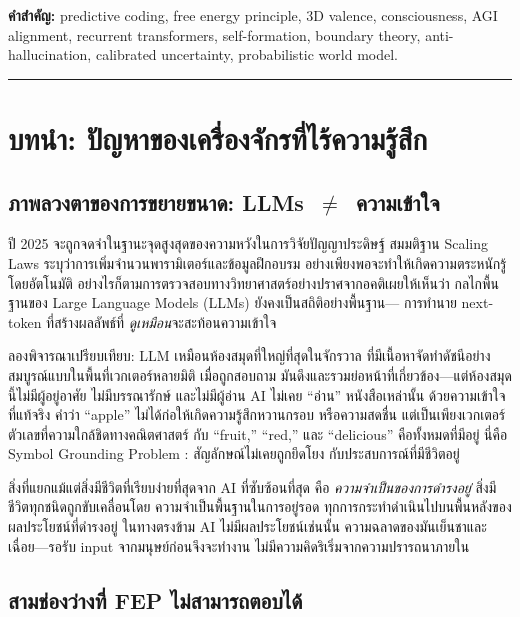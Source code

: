 \documentclass[12pt,a4paper]{article}
\begin{document}
\noindent\textbf{คำสำคัญ:}
predictive coding, free energy principle, 3D valence, consciousness,
AGI alignment, recurrent transformers, self-formation, boundary theory,
anti-hallucination, calibrated uncertainty, probabilistic world model.

\vspace{4pt}\hrule\vspace{6pt}
\tableofcontents
\newpage

\FloatBarrier
\section{บทนำ: ปัญหาของเครื่องจักรที่ไร้ความรู้สึก}

\subsection{ภาพลวงตาของการขยายขนาด: LLMs~$\neq$~ความเข้าใจ}

ปี 2025 จะถูกจดจำในฐานะจุดสูงสุดของความหวังในการวิจัยปัญญาประดิษฐ์
สมมติฐาน Scaling Laws ระบุว่าการเพิ่มจำนวนพารามิเตอร์และข้อมูลฝึกอบรม
อย่างเพียงพอจะทำให้เกิดความตระหนักรู้โดยอัตโนมัติ
อย่างไรก็ตามการตรวจสอบทางวิทยาศาสตร์อย่างปราศจากอคติเผยให้เห็นว่า
กลไกพื้นฐานของ Large Language Models (LLMs) ยังคงเป็นสถิติอย่างพื้นฐาน---
การทำนาย next-token ที่สร้างผลลัพธ์ที่ \emph{ดูเหมือน}จะสะท้อนความเข้าใจ

ลองพิจารณาเปรียบเทียบ: LLM เหมือนห้องสมุดที่ใหญ่ที่สุดในจักรวาล
ที่มีเนื้อหาจัดทำดัชนีอย่างสมบูรณ์แบบในพื้นที่เวกเตอร์หลายมิติ
เมื่อถูกสอบถาม มันดึงและรวมย่อหน้าที่เกี่ยวข้อง---แต่ห้องสมุดนี้ไม่มีผู้อยู่อาศัย
ไม่มีบรรณารักษ์ และไม่มีผู้อ่าน AI ไม่เคย ``อ่าน'' หนังสือเหล่านั้น
ด้วยความเข้าใจที่แท้จริง คำว่า ``apple'' ไม่ได้ก่อให้เกิดความรู้สึกหวานกรอบ
หรือความสดชื่น แต่เป็นเพียงเวกเตอร์ตัวเลขที่ความใกล้ชิดทางคณิตศาสตร์
กับ ``fruit,'' ``red,'' และ ``delicious'' คือทั้งหมดที่มีอยู่
นี่คือ Symbol Grounding Problem \citep{harnad1990}: สัญลักษณ์ไม่เคยถูกยึดโยง
กับประสบการณ์ที่มีชีวิตอยู่

สิ่งที่แยกแม้แต่สิ่งมีชีวิตที่เรียบง่ายที่สุดจาก AI ที่ซับซ้อนที่สุด
คือ \emph{ความจำเป็นของการดำรงอยู่} สิ่งมีชีวิตทุกชนิดถูกขับเคลื่อนโดย
ความจำเป็นพื้นฐานในการอยู่รอด ทุกการกระทำดำเนินไปบนพื้นหลังของ
ผลประโยชน์ที่ดำรงอยู่ ในทางตรงข้าม AI ไม่มีผลประโยชน์เช่นนั้น
ความฉลาดของมันเย็นชาและเฉื่อย---รอรับ input จากมนุษย์ก่อนจึงจะทำงาน
ไม่มีความคิดริเริ่มจากความปรารถนาภายใน

\subsection{สามช่องว่างที่ FEP ไม่สามารถตอบได้}
\end{document}
